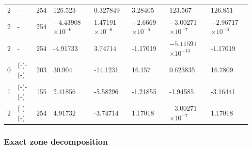 \begin{longtable}
{}2 & \allowbreak{}-\allowbreak{} & 254 & 126.523 & 0.327849 & 3.28405 & 123.567 & 126.851 \\
{}2 & \allowbreak{}-\allowbreak{} & 254 &  &  &  &  &  \\
{}2 & \allowbreak{}-\allowbreak{} & 254 & -4.91733 & 3.74714 & -1.17019 &  & -1.17019 \\
{}0 & (\allowbreak{}-\allowbreak{})-(\allowbreak{}-\allowbreak{}) & 203 & 30.904 & -14.1231 & 16.157 & 0.623835 & 16.7809 \\
{}1 & (\allowbreak{}-\allowbreak{})-(\allowbreak{}-\allowbreak{}) & 155 & 2.41856 & -5.58296 & -1.21855 & -1.94585 & -3.16441 \\
{}2 & (\allowbreak{}-\allowbreak{})-(\allowbreak{}-\allowbreak{}) & 254 & 4.91732 & -3.74714 & 1.17018 &  & 1.17018 \\
\end{longtable}\endgroup

\subsubsection{Exact zone decomposition}

